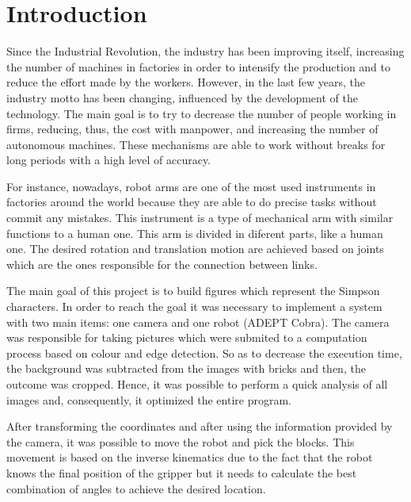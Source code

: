 \chapter{Introduction}\label{ch:introduction}

Since the Industrial Revolution, the industry has been improving itself, increasing the number of machines in factories in order to intensify the production and to reduce the effort made by the workers. However, in the last few years, the industry motto has been changing, influenced by the development of the technology. The main goal is to try to decrease the number of people working in firms, reducing, thus, the cost with manpower, and increasing the number of autonomous machines. These mechanisms are able to work without breaks for long periods with a high level of accuracy. 

For instance, nowadays, robot arms are one of the most used instruments in factories around the world because they are able to do precise tasks without commit any mistakes. This instrument is a type of mechanical arm with similar functions to a human one. This arm is divided in diferent parts, like a human one. The desired rotation and translation motion are achieved based on joints which are the ones responsible for the connection between links. 

The main goal of this project is to build figures which represent the Simpson characters. In order to reach the goal it was necessary to implement a system with two main items: one camera and one robot (ADEPT Cobra). The camera was responsible for taking pictures which were submited to a computation process based on colour and edge detection. So as to decrease the execution time, the background was subtracted from the images with bricks and then, the outcome was cropped. Hence, it was possible to perform a quick analysis of all images and, consequently, it optimized the entire program.

After transforming the coordinates and after using the information provided by the camera, it was possible to move the robot and pick the blocks. This movement is based on the inverse kinematics due to the fact that the robot knows the final position of the gripper but it needs to calculate the best combination of angles to achieve the desired location.
